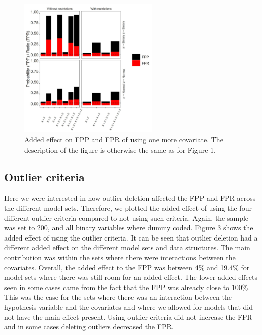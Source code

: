 \begin{figure}[t]
\includegraphics[width=0.6\textwidth]{R/Analysis/Result/Figures/Figure1C.jpeg}
\centering
\caption{Added effect on FPP and FPR of using one more covariate. The description of the figure is otherwise the same as for Figure 1.}
\label{fig:mainfigure}
\end{figure}

\subsection{Outlier criteria}
Here we were interested in how outlier deletion affected the FPP and FPR across the different model sets. Therefore, we plotted the added effect of using the four different outlier criteria compared to not using such criteria. Again, the sample was set to 200, and all binary variables where dummy coded. Figure 3 shows the added effect of using the outlier criteria. It can be seen that outlier deletion had a different added effect on the different model sets and data structures. The main contribution was within the sets where there were interactions between the covariates. Overall, the added effect to the FPP was between 4\% and 19.4\% for model sets where there was still room for an added effect. The lower added effects seen in some cases came from the fact that the FPP was already close to 100\%. This was the case for the sets where there was an interaction between the hypothesis variable and the covariates and where we allowed for models that did not have the main effect present. Using outlier criteria did not increase the FPR and in some cases deleting outliers decreased the FPR. 

